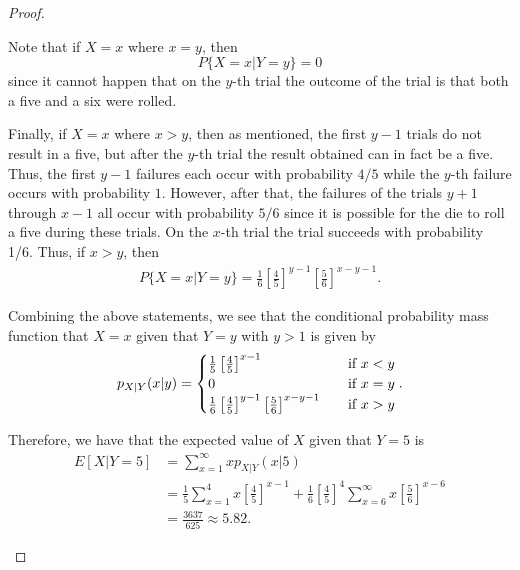 \begin{proof}
\begin{enumerate}
      Note that if $X=x$ where $x = y$, then
      $$P\{X=x | Y=y\} = 0$$
      since it cannot happen that on the $y$-th trial the outcome
      of the trial is that both a five and a six were rolled.

      Finally, if $X=x$ where $x > y$, then
      as mentioned, the first $y-1$ trials do not result in a five, but after the $y$-th trial
      the result obtained can in fact be a five. Thus, the first $y-1$ failures each occur with probability
      $4/5$ while the $y$-th failure occurs with probability $1$. However, after that, the failures
      of the trials $y + 1$ through $x - 1$ all occur with probability $5/6$ since it is possible for the die
      to roll a five during these trials. On the $x$-th trial the
      trial succeeds with probability 1/6. Thus, if $x > y$, then
      \begin{align*}
        P\{X=x | Y=y\} = \frac{1}{6}\left[\frac{4}{5}\right]^{y-1}\left[\frac{5}{6}\right]^{x - y - 1}.
      \end{align*}

      Combining the above statements, we see that the conditional probability mass function
      that $X=x$ given that $Y=y$ with $y > 1$ is given by
      \begin{align*}
        p_{X|Y}(x|y) =
        \begin{cases}
          \frac{1}{5}\left[\frac{4}{5}\right]^{x-1}& \text{\quad if $x < y$}\\
          0 & \text{\quad if $x = y$}\\
          \frac{1}{6}\left[\frac{4}{5}\right]^{y-1}\left[\frac{5}{6}\right]^{x - y - 1} & \text{\quad if $x > y$}\\
        \end{cases}.
      \end{align*}

      Therefore, we have that the expected value of $X$ given that $Y=5$ is
      \begin{align*}
        E[X|Y=5] &= \sum_{x=1}^\infty x p_{X|Y}(x|5)\\
        &= \frac{1}{5}\sum_{x=1}^{4} x\left[\frac{4}{5}\right]^{x-1} + \frac{1}{6}\left[\frac{4}{5}\right]^{4}\sum_{x=6}^{\infty}x\left[\frac{5}{6}\right]^{x - 6} \\
        &= \frac{3637}{625} \approx 5.82.
      \end{align*}



  \end{enumerate}
\end{proof}
\newpage
